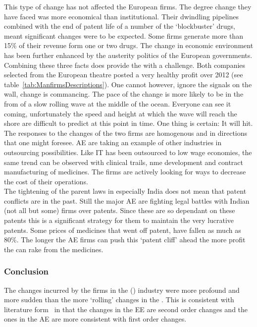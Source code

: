 This type of change has not affected the European \pharma firms. 
The degree change they have faced was more economical than institutional. 
Their dwindling pipelines combined with the end of patent life of a number of the `blockbuster' drugs, meant significant changes were to be expected.
Some  firms generate  more than 15\% of their revenue form one or two drugs.
The change in economic environment has been further enhanced by the austerity politics of the European governments.
Combining these three facts does provide the \pharmas with a challenge.
Both companies selected from the European \pharma theatre posted a very healthy profit over 2012 (see table~\ref{tab:ManfirmsDescriptions}).
One cannot however, ignore the signals on the wall, change is commancing.
The pace of the change is more likely to be in the from of a slow rolling wave at the middle of the ocean.
Everyone can see it coming, unfortunately the speed and height at which the wave will reach the shore are difficult to predict at this point in time.
One thing is certain: It will hit.\\
The responses to the changes of the two firms are homogenous and in directions that one might foresee. 
\Glsdesc{AE} \pharmas are taking an example of other industries in outsourcing possibilities.
Like IT has been outsourced to low wage economies, the same trend can be observed with clinical trails, \gls{nme} development and contract manufacturing of medicines.
The firms are actively looking for ways to decrease the cost of their operations.\\
The tightening of the parent laws in especially India does not mean that patent conflicts are in the past. 
Still the major \glsdesc{AE} \pharma are fighting legal battles with Indian (not all but some) firms over patents.
Since these  are so dependant on these patents this is a significant strategy for them to maintain the very lucrative patents.
Some prices of medicines that went off patent, have fallen as much as 80\%.
The longer the AE firms can push this `patent cliff' ahead the more profit the can rake from the medicines. 

\subsubsection{Conclusion}
The changes incurred by the  firms in the \pharma (\manu) industry were more profound and more sudden than the more `rolling' changes in the .
This is consistent with literature form~\citep{Meyer:1995td} in that the changes in the EE are second order changes and the ones in the AE are more consistent with first order changes.


